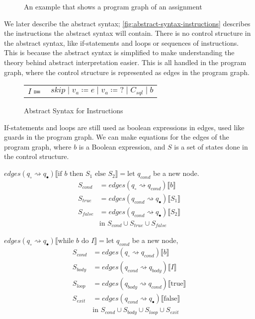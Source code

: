 \begin{figure}[htb!]
    \center
    
    \caption{An example that shows a program graph of an assignment}
    \label{fig:tikz-program-graph-assignment}
\end{figure}

We later describe the abstract syntax; \autoref{fig:abstract-syntax-instructions} describes the instructions the abstract syntax will contain.
There is no control structure in the abstract syntax, like if-statements and loops or sequences of instructions.
This is because the abstract syntax is simplified to make understanding the theory behind abstract interpretation easier.
This is all handled in the program graph, where the control structure is represented as edges in the program graph.

\begin{figure}
    \center
    \begin{tabular}{r l}
        $I \Coloneqq$ & $skip \mid v_a \coloneqq e \mid v_a \coloneqq ? \mid C_{sql} \mid b$
    \end{tabular}
    \caption{Abstract Syntax for Instructions}
    \label{fig:abstract-syntax-instructions}
\end{figure}

If-statements and loops are still used as boolean expressions in edges, used like guards in the program graph.
We can make equations for the edges of the program graph, where $b$ is a Boolean expression, and $S$ is a set of states done in the control structure.

$edges(q_{\circ} \rightsquigarrow q_{\bullet})\llbracket \text{if } b \text{ then } S_1 \text{ else } S_2 \rrbracket = \text{let } q_{cond}$ be a new node.
\begin{align}
S_{cond} &= edges(q_\circ \rightsquigarrow q_{cond})\llbracket b \rrbracket \\
S_{true} &= edges(q_{cond} \rightsquigarrow q_{\bullet})\llbracket S_1 \rrbracket \\
    S_{false} &= edges(q_{cond} \rightsquigarrow q_{\bullet})\llbracket S_2 \rrbracket \\
    &\text{in } S_{cond} \cup S_{true} \cup S_{false}
\end{align}

$edges(q_{\circ} \rightsquigarrow q_{\bullet})\llbracket \text{while } b \text{ do } I\rrbracket= \text{let } q_{cond}$ be a new node,
\begin{align}
    S_{cond} &= edges(q_\circ \rightsquigarrow q_{cond}) \llbracket b \rrbracket \\
    S_{body}&=edges(q_{cond} \rightsquigarrow q_{body})\llbracket I \rrbracket \\
    S_{loop} &= edges(q_{body} \rightsquigarrow q_{cond})\llbracket\text{true}\rrbracket \\
    S_{exit} &= edges(q_{cond} \rightsquigarrow q_{\bullet})\llbracket\text{false}\rrbracket \\
    &\text{in } S_{cond} \cup S_{body} \cup S_{loop} \cup S_{exit}
\end{align}

